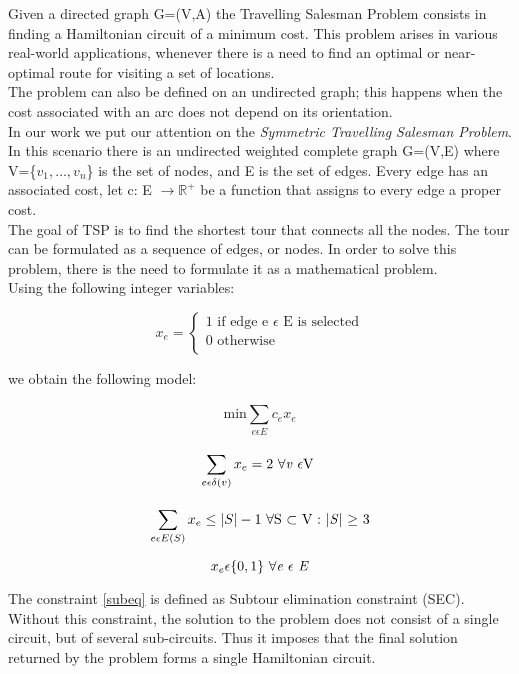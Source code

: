 Given a directed graph G=(V,A) the Travelling Salesman Problem consists in finding a Hamiltonian circuit of a minimum cost. This problem arises in various real-world applications, whenever there is a need to find an optimal or near-optimal route for visiting a set of locations.\\
The problem can also be defined on an undirected graph; this happens when the cost associated with an arc does not depend on its orientation.\\ 
In our work we put our attention on the \textit{Symmetric Travelling Salesman Problem}. In this scenario there is an undirected weighted complete graph G=(V,E) where V=\{$v_1,\dotsc,v_n$\} is the set of nodes, and E is the set of edges. Every edge has an associated cost, let c: E $\rightarrow \mathbb{R}^+$ be a function that assigns to every edge a proper cost.\\
The goal of TSP is to find the shortest tour that connects all the nodes. The tour can be formulated as a sequence of edges, or nodes. In order to solve this problem, there is the need to formulate it as a mathematical problem.
\\Using the following integer variables:



\begin{equation*}
    x_e=
        \begin{cases}
            \text{1 if edge e $\epsilon$ E is selected}\\
        0 \text{ otherwise}\\
          \end{cases}
\end{equation*}

we obtain the following model:

\begin{equation}
    \text{min}\sum_{e \epsilon E}^{}c_ex_e
\end{equation}

\begin{equation}
    \sum_{e \epsilon \delta (v)}^{}x_e=2 \text{ $\forall$\textit{v} $\epsilon$V } 
\end{equation}

\begin{equation} \label{subeq}
    \sum_{e\epsilon E(S)}^{}x_e \leq |S|-1 \text{ $\forall$S $\subset$ V : |\textit{S}| $\geq$ 3}
\end{equation}

\begin{equation}
    x_e \epsilon \{0,1\} \text{ $\forall$\textit{e} $\epsilon$ \textit{E}}
\end{equation}


The constraint \ref{subeq} is defined as Subtour elimination constraint (SEC). Without this constraint, the solution to the problem does not consist of a single circuit, but of several sub-circuits. Thus it imposes that the final solution returned by the problem forms a single Hamiltonian circuit.